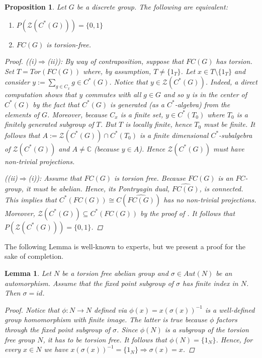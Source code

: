 \documentclass[11pt, twoside]{amsart}
\newtheorem{prop}[thm]{Proposition}
\newtheorem{lemma}[thm]{Lemma}
\theoremstyle{definition}
\newcommand{\B}{\mathbb}
\newcommand{\C}{\B{C}}
\newcommand{\ZZ}{\mathcal{Z}}
\begin{document}
\begin{prop}\label{characterization of projectionless center}
    Let $G$ be a discrete group. The following are equivalent:
    \begin{enumerate}[label=(\roman*).]
        \item $P(\ZZ(C^*(G)))=\{0,1\}$
        \item $FC(G)$ is torsion-free.
    \end{enumerate}
    \begin{proof} {\em ((i)$\Rightarrow$(ii))}:  By way of contraposition, suppose that $FC(G)$ has torsion. Set $T=Tor(FC(G))$ where, by assumption, $T\neq \{1_T\}$. Let $x\in T\setminus\{1_T\}$ and consider $y:=\sum_{g\in C_x}g\in C^*(G)$. Notice that $y\in \ZZ(C^*(G))$. Indeed, a direct computation shows that $y$ commutes with all $g\in G$ and so $y$ is in the center of $C^*(G)$ by the fact that $C^*(G)$ is generated (as a $C^*$-algebra) from the elements of $G$. Moreover, because $C_x$ is a finite set, $y\in C^*(T_0)$ where $T_0$ is a finitely generated subgroup of $T$. But $T$ is locally finite, hence $T_0$ must be finite. It follows that $A:=\ZZ(C^*(G))\cap C^*(T_0)$ is a finite dimensional $C^*$-subalgebra of $\ZZ(C^*(G))$ and $A\neq \C$ (because $y\in A$). Hence $\ZZ(C^*(G))$ must have non-trivial projections. \par

{\em ((ii)$\Rightarrow$(i))}: Assume that $FC(G)$ is torsion free. Because $FC(G)$ is an $FC$-group, it must be abelian. Hence, its Pontryagin dual, $\widehat{FC(G)}$, is connected. This implies that $C^*(FC(G))\cong C(\widehat{FC(G)})$ has no non-trivial projections. Moreover, $\ZZ(C^*(G))\subseteq C^*(FC(G))$ by the proof of \cite[Prop. 2.6]{tf_2_step_c*_superrigid}. It follows that $P(\ZZ(C^*(G)))=\{0,1\}$.
    \end{proof}
\end{prop}
The following Lemma is well-known to experts, but we present a proof for the sake of completion.
\begin{lemma}\label{fixed point subgroup of non-trivial autom}
 Let $N$ be a torsion free abelian group and $\sigma\in Aut(N)$ be an automorphism. Assume that the fixed point subgroup of $\sigma$ has finite index in $N$. Then $\sigma=id$.
 \begin{proof}
     Notice that $\phi:N\to N$ defined via $\phi(x)=x(\sigma(x))^{-1}$ is a well-defined group homomorphism with finite image. The latter is true because $\phi$ factors through the fixed point subgroup of $\sigma$.
     Since $\phi(N)$ is a subgroup of the torsion free group $N$, it has to be torsion free. It follows that $\phi(N)=\{1_{N}\}$. Hence, for every $x \in N$ we have $x(\sigma(x))^{-1}=\{1_N\} \Rightarrow \sigma(x)=x$.

    
 \end{proof}

\end{lemma}
\end{document}
